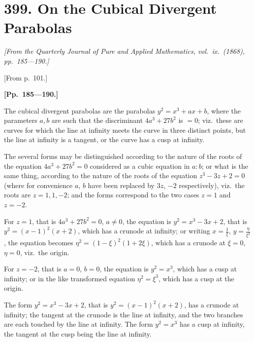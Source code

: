 \documentclass[11pt,a4paper]{article}
\theoremstyle{definition}
\begin{document}
\newpage


\section*{399. On the Cubical Divergent Parabolas}

\begin{flushright}
\textit{[From the Quarterly Journal of Pure and Applied Mathematics, vol.\ ix.\ (1868), pp.~185---190.]}
\end{flushright}

\vspace{0.5em}

[From p.~101.]

\bigskip

\noindent\textbf{[Pp.~185---190.]}

The cubical divergent parabolas are the parabolas $y^2 = x^3 + ax + b$, where the parameters $a, b$ are such that the discriminant $4a^3 + 27b^2$ is $= 0$; viz.\ these are curves for which the line at infinity meets the curve in three distinct points, but the line at infinity is a tangent, or the curve has a cusp at infinity.

The several forms may be distinguished according to the nature of the roots of the equation $4a^3 + 27b^2 = 0$ considered as a cubic equation in $a:b$; or what is the same thing, according to the nature of the roots of the equation $z^3 - 3z + 2 = 0$ (where for convenience $a$, $b$ have been replaced by $3z$, $-2$ respectively), viz.\ the roots are $z = 1, 1, -2$; and the forms correspond to the two cases $z = 1$ and $z = -2$.

For $z = 1$, that is $4a^3 + 27b^2 = 0$, $a \neq 0$, the equation is $y^2 = x^3 - 3x + 2$, that is $y^2 = (x-1)^2(x+2)$, which has a crunode at infinity; or writing $x = \frac{1}{\xi}$, $y = \frac{\eta}{\xi^2}$, the equation becomes $\eta^2 = (1-\xi)^2(1+2\xi)$, which has a crunode at $\xi = 0$, $\eta = 0$, viz.\ the origin.

For $z = -2$, that is $a = 0$, $b = 0$, the equation is $y^2 = x^3$, which has a cusp at infinity; or in the like transformed equation $\eta^2 = \xi^3$, which has a cusp at the origin.

The form $y^2 = x^3 - 3x + 2$, that is $y^2 = (x-1)^2(x+2)$, has a crunode at infinity; the tangent at the crunode is the line at infinity, and the two branches are each touched by the line at infinity. The form $y^2 = x^3$ has a cusp at infinity, the tangent at the cusp being the line at infinity.
\end{document}
